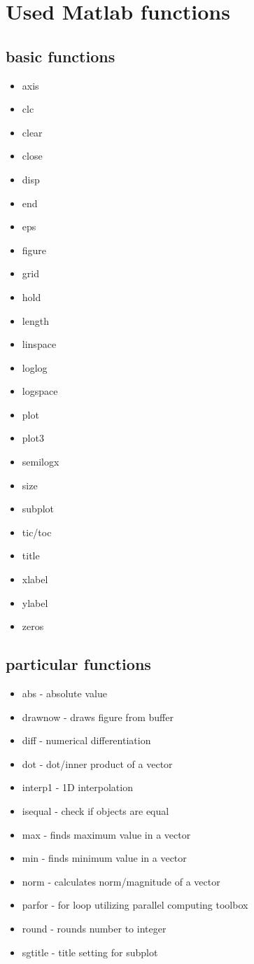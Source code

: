 \documentclass[english,12pt,a4paper, notitlepage]{report}
\begin{document}
	\chapter{Used Matlab functions}
		\section{basic functions}
			\begin{itemize}
				\setlength\itemsep{0.1px}
				\item axis
				\item clc 
				\item clear
				\item close
				\item disp 
				\item end 
				\item eps 
				\item figure
				\item grid 
				\item hold 
				\item length 
				\item linspace
				\item loglog
				\item logspace
				\item plot
				\item plot3
				\item semilogx 
				\item size 
				\item subplot
				\item tic/toc 
				\item title
				\item xlabel
				\item ylabel
				\item zeros
			\end{itemize}
		
		\section{particular functions}
			\begin{itemize}
				\setlength\itemsep{0.1px}
				\item abs - absolute value
				\item drawnow - draws figure from buffer
				\item diff - numerical differentiation
				\item dot - dot/inner product of a vector
				\item interp1 - 1D interpolation
				\item isequal - check if objects are equal
				\item max - finds maximum value in a vector
				\item min - finds minimum value in a vector
				\item norm - calculates norm/magnitude of a vector
				\item parfor - for loop utilizing parallel computing toolbox
				\item round - rounds number to integer
				\item sgtitle - title setting for subplot
			\end{itemize}
			
\end{document}
